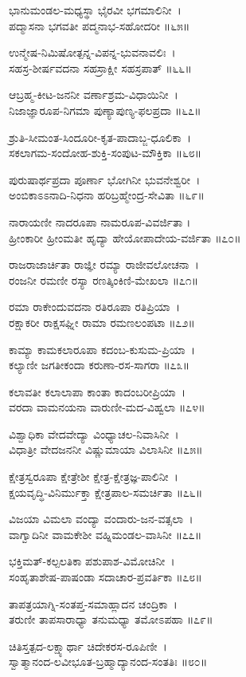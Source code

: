 ಭಾನುಮಂಡಲ-ಮಧ್ಯಸ್ಥಾ ಭೈರವೀ ಭಗಮಾಲಿನೀ~।\\
ಪದ್ಮಾಸನಾ ಭಗವತೀ ಪದ್ಮನಾಭ-ಸಹೋದರೀ ॥೬೫॥

ಉನ್ಮೇಷ-ನಿಮಿಷೋತ್ಪನ್ನ-ವಿಪನ್ನ-ಭುವನಾವಲಿಃ~।\\
ಸಹಸ್ರ-ಶೀರ್ಷವದನಾ ಸಹಸ್ರಾಕ್ಷೀ ಸಹಸ್ರಪಾತ್ ॥೬೬॥

ಆಬ್ರಹ್ಮ-ಕೀಟ-ಜನನೀ ವರ್ಣಾಶ್ರಮ-ವಿಧಾಯಿನೀ~।\\
ನಿಜಾಜ್ಞಾರೂಪ-ನಿಗಮಾ ಪುಣ್ಯಾಪುಣ್ಯ-ಫಲಪ್ರದಾ ॥೬೭॥

ಶ್ರುತಿ-ಸೀಮಂತ-ಸಿಂದೂರೀ-ಕೃತ-ಪಾದಾಬ್ಜ-ಧೂಲಿಕಾ~।\\
ಸಕಲಾಗಮ-ಸಂದೋಹ-ಶುಕ್ತಿ-ಸಂಪುಟ-ಮೌಕ್ತಿಕಾ ॥೬೮॥

ಪುರುಷಾರ್ಥಪ್ರದಾ ಪೂರ್ಣಾ ಭೋಗಿನೀ ಭುವನೇಶ್ವರೀ~।\\
ಅಂಬಿಕಾಽಽನಾದಿ-ನಿಧನಾ ಹರಿಬ್ರಹ್ಮೇಂದ್ರ-ಸೇವಿತಾ ॥೬೯॥

ನಾರಾಯಣೀ ನಾದರೂಪಾ ನಾಮರೂಪ-ವಿವರ್ಜಿತಾ ।\\
ಹ್ರೀಂಕಾರೀ ಹ್ರೀಂಮತೀ ಹೃದ್ಯಾ ಹೇಯೋಪಾದೇಯ-ವರ್ಜಿತಾ ॥೭೦॥

ರಾಜರಾಜಾರ್ಚಿತಾ ರಾಜ್ಞೀ ರಮ್ಯಾ ರಾಜೀವಲೋಚನಾ~।\\
ರಂಜನೀ ರಮಣೀ ರಸ್ಯಾ ರಣತ್ಕಿಂಕಿಣಿ-ಮೇಖಲಾ ॥೭೧॥

ರಮಾ ರಾಕೇಂದುವದನಾ ರತಿರೂಪಾ ರತಿಪ್ರಿಯಾ~।\\
ರಕ್ಷಾಕರೀ ರಾಕ್ಷಸಘ್ನೀ ರಾಮಾ ರಮಣಲಂಪಟಾ ॥೭೨॥

ಕಾಮ್ಯಾ ಕಾಮಕಲಾರೂಪಾ ಕದಂಬ-ಕುಸುಮ-ಪ್ರಿಯಾ~।\\
ಕಲ್ಯಾಣೀ ಜಗತೀಕಂದಾ ಕರುಣಾ-ರಸ-ಸಾಗರಾ ॥೭೩॥

ಕಲಾವತೀ ಕಲಾಲಾಪಾ ಕಾಂತಾ ಕಾದಂಬರೀಪ್ರಿಯಾ~।\\
ವರದಾ ವಾಮನಯನಾ ವಾರುಣೀ-ಮದ-ವಿಹ್ವಲಾ ॥೭೪॥

ವಿಶ್ವಾಧಿಕಾ ವೇದವೇದ್ಯಾ ವಿಂಧ್ಯಾಚಲ-ನಿವಾಸಿನೀ~।\\
ವಿಧಾತ್ರೀ ವೇದಜನನೀ ವಿಷ್ಣುಮಾಯಾ ವಿಲಾಸಿನೀ ॥೭೫॥

ಕ್ಷೇತ್ರಸ್ವರೂಪಾ ಕ್ಷೇತ್ರೇಶೀ ಕ್ಷೇತ್ರ-ಕ್ಷೇತ್ರಜ್ಞ-ಪಾಲಿನೀ~।\\
ಕ್ಷಯವೃದ್ಧಿ-ವಿನಿರ್ಮುಕ್ತಾ ಕ್ಷೇತ್ರಪಾಲ-ಸಮರ್ಚಿತಾ ॥೭೬॥

ವಿಜಯಾ ವಿಮಲಾ ವಂದ್ಯಾ ವಂದಾರು-ಜನ-ವತ್ಸಲಾ~।\\
ವಾಗ್ವಾದಿನೀ ವಾಮಕೇಶೀ ವಹ್ನಿಮಂಡಲ-ವಾಸಿನೀ ॥೭೭॥

ಭಕ್ತಿಮತ್-ಕಲ್ಪಲತಿಕಾ ಪಶುಪಾಶ-ವಿಮೋಚಿನೀ~।\\
ಸಂಹೃತಾಶೇಷ-ಪಾಷಂಡಾ ಸದಾಚಾರ-ಪ್ರವರ್ತಿಕಾ ॥೭೮॥

ತಾಪತ್ರಯಾಗ್ನಿ-ಸಂತಪ್ತ-ಸಮಾಹ್ಲಾದನ ಚಂದ್ರಿಕಾ~।\\
ತರುಣೀ ತಾಪಸಾರಾಧ್ಯಾ ತನುಮಧ್ಯಾ ತಮೋಽಪಹಾ ॥೭೯॥

ಚಿತಿಸ್ತತ್ಪದ-ಲಕ್ಷ್ಯಾರ್ಥಾ ಚಿದೇಕರಸ-ರೂಪಿಣೀ~।\\
ಸ್ವಾತ್ಮಾನಂದ-ಲವೀಭೂತ-ಬ್ರಹ್ಮಾದ್ಯಾನಂದ-ಸಂತತಿಃ ॥೮೦॥

